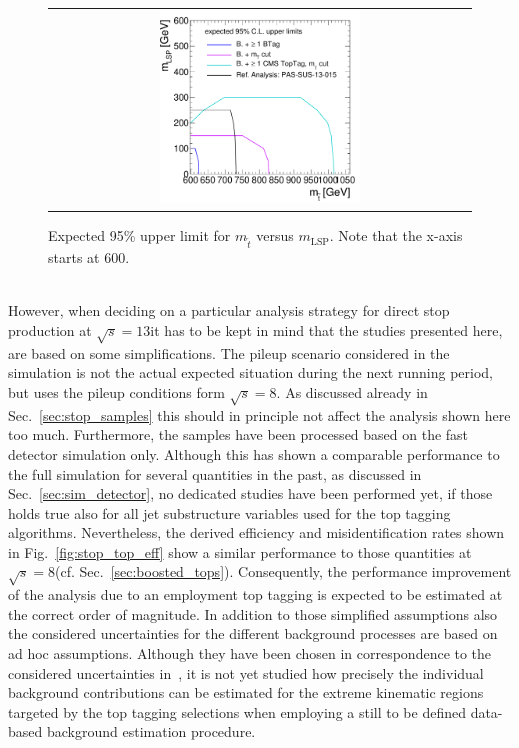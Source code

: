 \begin{figure}[!t]
  \centering
  \begin{tabular}{c}
                \includegraphics[width=0.49\textwidth]{figures/2Dlimitplot.pdf} 
  \end{tabular}
  \caption{Expected 95\% upper limit for $m_{\tilde{t}}$ versus $m_\mathrm{LSP}$. Note that the x-axis starts at 600\gev. }
  \label{fig:stop_2Dlimit}
\end{figure}
\\
However, when deciding on a particular analysis strategy for direct stop production at $\sqrt{s} = 13$\tev it has to be kept in mind that the studies presented here, are based on some simplifications.  The pileup scenario considered in the simulation is not the actual expected situation during the next running period, but uses the pileup conditions form $\sqrt{s} = 8$\tev. As discussed already in Sec.~\ref{sec:stop_samples} this should in principle not affect the analysis shown here too much. Furthermore, the samples have been processed based on the fast detector simulation only. Although this has shown a comparable performance to the full simulation for several quantities in the past, as discussed in Sec.~\ref{sec:sim_detector}, no dedicated studies have been performed yet, if those holds true also for all jet substructure variables used for the top tagging algorithms. Nevertheless, the derived efficiency and misidentification rates shown in Fig.~\ref{fig:stop_top_eff} show a similar performance to those quantities at $\sqrt{s} = 8$\tev (cf. Sec.~\ref{sec:boosted_tops}). Consequently, the performance improvement of the analysis due to an employment top tagging is expected to be estimated at the correct order of magnitude. In addition to those simplified assumptions also the considered uncertainties for the different background processes are based on ad hoc assumptions. Although they have been chosen in correspondence to the considered uncertainties in~\cite{CMS-PAS-SUS-13-015}, it is not yet studied how precisely the individual background contributions can be estimated for the extreme kinematic regions targeted by the top tagging selections when employing a still to be defined data-based background estimation procedure. \\

